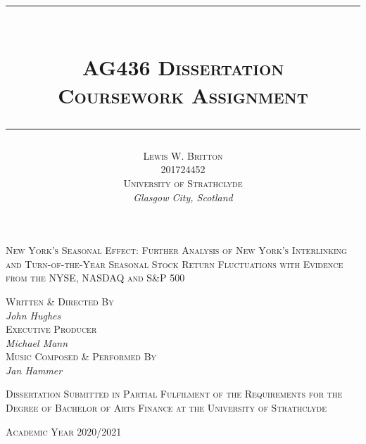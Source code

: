 \documentclass[11pt, english]{article}
\newcommand{\HRule}[1]{\rule{\linewidth}{#1}}
\begin{document}


	\title{
                \HRule{0.5pt}\\ [0.3cm]
                \huge\textsc{AG436 Dissertation}\\
                \Large\textsc{Coursework Assignment}\\ [0.25cm]
                \HRule{0.5pt}
                }
	\author{\textsc{Lewis W. Britton}\\
                \textsc{201724452}\\
                \textsc{University of Strathclyde}\\
		\textit{Glasgow City, Scotland}
                }
	\date{}
	\maketitle

        \begin{center}
                \textsc{New York's Seasonal Effect: Further Analysis of New York's Interlinking and Turn-of-the-Year Seasonal Stock Return Fluctuations with Evidence from the NYSE, NASDAQ and S\&P 500}
        \end{center}

        \vspace{\fill}

	\begin{center}
		\textsc{Written \& Directed By}\\ \textit{John Hughes}\\
		\textsc{Executive Producer}\\ \textit{Michael Mann}\\
		\textsc{Music Composed \& Performed By}\\ \textit{Jan Hammer}
	\end{center}

	\begin{center}
	\end{center}

	\begin{center}
        	\textsc{Dissertation Submitted in Partial Fulfilment of the Requirements for the Degree of Bachelor of Arts Finance at the University of Strathclyde}
	\end{center}

	\begin{center}
		\textsc{Academic Year 2020/2021}
	\end{center}
\end{document}
